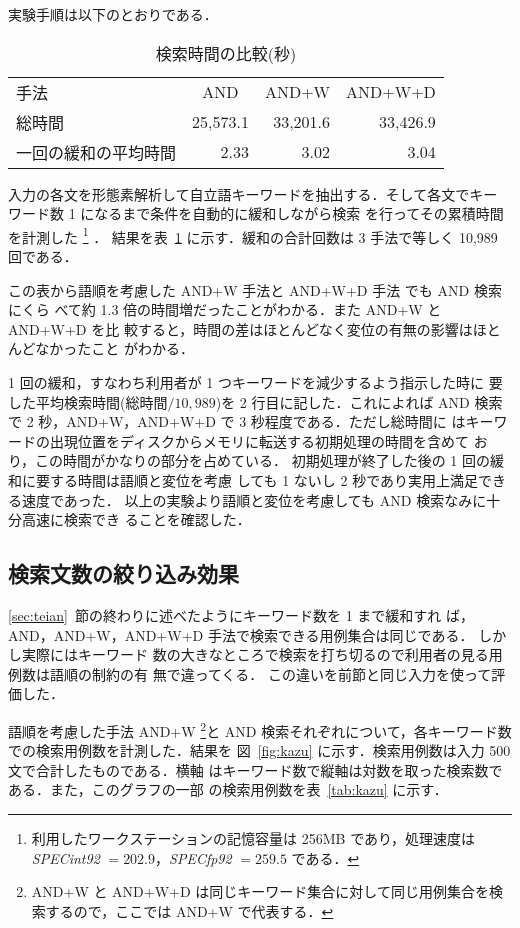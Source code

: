 実験手順は以下のとおりである．
\begin{table}
 \begin{center}
  \caption{検索時間の比較(秒)}
  \label{tab:jikan}
  \begin{tabular}{l|rrr}\hline\hline
   手法 & \multicolumn{1}{c}{AND} & \multicolumn{1}{c}{AND+W} &
\multicolumn{1}{c}{AND+W+D}\\\cline{2-4}
   総時間 & 25,573.1 & 33,201.6 & 33,426.9\\
   一回の緩和の平均時間 & 2.33 & 3.02 & 3.04 \\\hline 
  \end{tabular}
 \end{center}
\end{table}
入力の各文を形態素解析して自立語キーワードを抽出する．そして各文でキー
ワード数 1 になるまで条件を自動的に緩和しながら検索
を行ってその累積時間を計測した
\footnote{利用したワークステーションの記憶容量は 256MB であり，処理速度は {\it SPECint92} $=202.9$，{\it SPECfp92} $=259.5$ である．
 }
．
結果を表~\ref{tab:jikan} に示す．緩和の合計回数は 3 手法で等しく 
10,989 回である．

この表から語順を考慮した AND+W 手法と AND+W+D 手法 でも AND 検索にくら
べて約 1.3 倍の時間増だったことがわかる．また AND+W と AND+W+D を比
較すると，時間の差はほとんどなく変位の有無の影響はほとんどなかったこと
がわかる．

1 回の緩和，すなわち利用者が 1 つキーワードを減少するよう指示した時に
要した平均検索時間(総時間$/10,989$)を 2 行目に記した．これによれば AND 
検索で 2 秒，AND+W，AND+W+D で 3 秒程度である．ただし総時間に
はキーワードの出現位置をディスクからメモリに転送する初期処理の時間を含めて
おり，この時間がかなりの部分を占めている．
初期処理が終了した後の 1 回の緩和に要する時間は語順と変位を考慮
しても 1 ないし 2 秒であり実用上満足できる速度であった．
以上の実験より語順と変位を考慮しても AND 検索なみに十分高速に検索でき
ることを確認した．
\subsection{検索文数の絞り込み効果}
\label{sec:siborikomi}
\ref{sec:teian}~節の終わりに述べたようにキーワード数を 1 まで緩和すれ
ば，AND，AND+W，AND+W+D 手法で検索できる用例集合は同じである．
しかし実際にはキーワード
数の大きなところで検索を打ち切るので利用者の見る用例数は語順の制約の有
無で違ってくる．
この違いを前節と同じ入力を使って評価した．

語順を考慮した手法 AND+W
\footnote{AND+W と AND+W+D は同じキーワード集合に対して同じ用例集合を検
索するので，ここでは AND+W で代表する．}と
AND 検索それぞれについて，各キーワード数での検索用例数を計測した．結果を
図~\ref{fig:kazu} に示す．検索用例数は入力 500 文で合計したものである．横軸
はキーワード数で縦軸は対数を取った検索数である．また，このグラフの一部
の検索用例数を表~\ref{tab:kazu} に示す．

